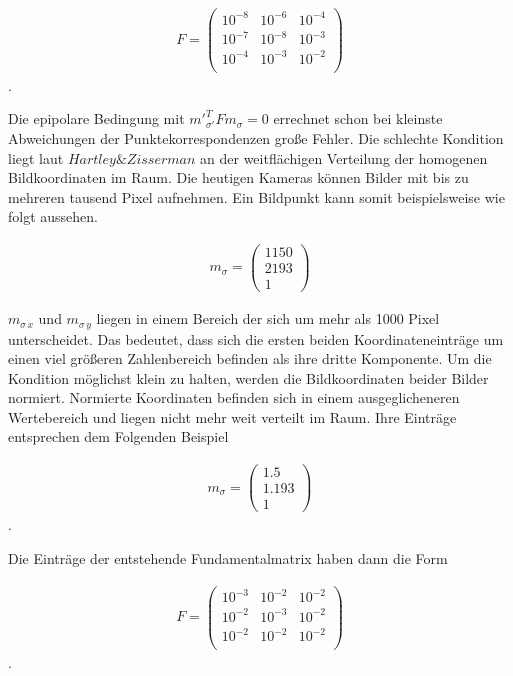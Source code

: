 \begin{gather}
	F = \begin{pmatrix}
		10^{-8}&10^{-6}&10^{-4}\\
		10^{-7}&10^{-8}&10^{-3}\\
		10^{-4}&10^{-3}&10^{-2}\\
	\end{pmatrix}
\end{gather}.

Die epipolare Bedingung mit $m'^T_{\sigma'}Fm_\sigma = 0$ errechnet schon bei kleinste Abweichungen der Punktekorrespondenzen große Fehler. Die schlechte Kondition liegt laut $Hartley \& Zisserman$ an der weitflächigen Verteilung der homogenen Bildkoordinaten im Raum. Die heutigen Kameras können Bilder mit bis zu mehreren tausend Pixel aufnehmen. Ein Bildpunkt kann somit beispielsweise wie folgt aussehen.

\begin{gather}
	m_\sigma = \begin{pmatrix}
		1150\\2193\\1
	\end{pmatrix}
\end{gather}

$m_{\sigma\, x}$ und $m_{\sigma\, y}$ liegen in einem Bereich der sich um mehr als 1000 Pixel unterscheidet. Das bedeutet, dass sich die ersten beiden Koordinateneinträge um einen viel größeren Zahlenbereich befinden als ihre dritte Komponente. Um die Kondition möglichst klein zu halten, werden die Bildkoordinaten beider Bilder normiert\cite{HZ8,Brooks}. Normierte Koordinaten befinden sich in einem ausgeglicheneren Wertebereich und liegen nicht mehr weit verteilt im Raum\cite{HZ8}. Ihre Einträge entsprechen dem Folgenden Beispiel

 \begin{gather}
 	m_\sigma = \begin{pmatrix}
 		1.5\\1.193\\1
 	\end{pmatrix}
 \end{gather}.

Die Einträge der entstehende Fundamentalmatrix haben dann die Form

\begin{gather}
	F = \begin{pmatrix}
		10^{-3}&10^{-2}&10^{-2}\\
		10^{-2}&10^{-3}&10^{-2}\\
		10^{-2}&10^{-2}&10^{-2}\\
	\end{pmatrix}
\end{gather}.

